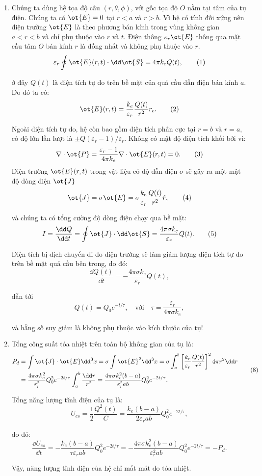 \begin{loigiai}\[\]
  \begin{enumerate}[1)]
  \item Chúng ta dùng hệ tọa độ cầu $(r,\theta,\phi)$, với gốc tọa độ $O$ nằm tại tâm của tụ điện. Chúng ta có $\ot{E} = 0$ tại $r<a$ và $r>b$. Vì hệ có tính đối xứng nên điện trường $\ot{E}$ là theo phương bán kính trong vùng không gian $a<r<b$ và chỉ phụ thuộc vào $r$ và $t$. Điện thông $\varepsilon_r \ot{E} $ thông qua mặt cầu tâm $O$ bán kính $r$ là đồng nhất và không phụ thuộc vào $r$.
   \[\varepsilon_r \oint \ot{E} (r,t) \cdot \dd \ot{S}= 4\pi k_e Q(t) , \tag{1}\]

ở đây $Q(t)$ là điện tích tự do trên bề mặt của quả cầu dẫn điện bán kính $a$. Do đó ta có:
    \[\ot{E}(r,t)= \frac{k_e}{\varepsilon_r} \frac{Q(t)}{r^2}r_c . \tag{2} \]

Ngoài điện tích tự do, hệ còn bao gồm điện tích phân cực tại $r=b$ và $r=a$, có độ lớn lần lượt là $\pm Q(\varepsilon_r -1)/\varepsilon_r$. Không có mật độ điện tích khối bởi vì:
    \[\nabla \cdot \ot{P} = \frac{\varepsilon_r -1}{4\pi k_e} \nabla \cdot \ot{E} (r,t) =0 . \tag{3} \]
Điện trường $\ot{E}(r,t)$ trong vật liệu có độ dẫn điện $\sigma$ sẽ gây ra một mật độ dòng điện $\ot{J}$
      \[\ot{J} = \sigma \ot{E} = \sigma \frac{k_e}{\varepsilon_r}\frac{Q(t)}{r^2} \hat{{r}}, \tag{4} \]

và chúng ta có tổng cường độ dòng điện chạy qua bề mặt:
  \[ I = \frac{\dd Q}{\dd t} = \oint \ot{J} \cdot \dd \ot{S} = \frac{4\pi \sigma k_e}{\varepsilon_r} Q(t). \tag{5}\]

Điện tích bị dịch chuyển đi do điện trường sẽ làm giảm lượng điện tích tự do trên bề mặt quả cầu bên trong, do đó:
  \[\frac{\dd Q(t)}{\dd t}= -\frac{4\pi \sigma k_e}{\varepsilon_r}Q(t), \tag{6}\]

dẫn tới
    \[ Q(t) = Q_0 e^{-t/\tau},\quad \text{với} \quad \tau = \frac{\varepsilon_r}{4\pi\sigma k_e} , \tag{7}\]

và hằng số suy giảm là không phụ thuộc vào kích thước của tụ!
  \item Tổng công suất tỏa nhiệt trên toàn bộ không gian của tụ là:
   \[\begin{aligned} P_d &= \int \ot{J} \cdot \ot{E} \dd^3 x = \sigma \int \ot{E}^2 \dd^3 x = \sigma \int_{a}^{b} \left[ \frac{k_e}{\varepsilon_r} \frac{Q(t)}{r^2}\right] ^2 4 \pi r^2 \dd r \\
    &= \frac{4\pi \sigma k_e^2}{\varepsilon_r^2} Q_0^2 e^{-2t/\tau} \int_{a}^{b} \frac{\dd r}{r^2} = \frac{4\pi \sigma k_e^2 (b-a)}{\varepsilon_r^2 ab} Q_0^2 e^{-2t/\tau} . \end{aligned} \tag{8}\]

Tổng năng lượng tĩnh điện của tụ là:
   \[U_{es} = \frac{1}{2} \frac{Q^2(t)}{C} = \frac{k_e (b-a)}{2 \varepsilon_r ab}Q_0^2 e^{-2t/\tau} , \tag{9}\]

do đó:
  \[\frac{\dd U_{es}}{\dd t} = - \frac{k_e (b-a)}{\tau \varepsilon_r ab} Q_0^2 e^{-2t/\tau} = -\frac{4\pi\sigma k_e^2(b-a)}{\varepsilon_r^2 ab} Q_0^2 e^{-2t/\tau} = -P_d. \tag{10} \]

Vậy, năng lượng tĩnh điện của hệ chỉ mất mát do tỏa nhiệt.
\end{enumerate}
\end{loigiai}
